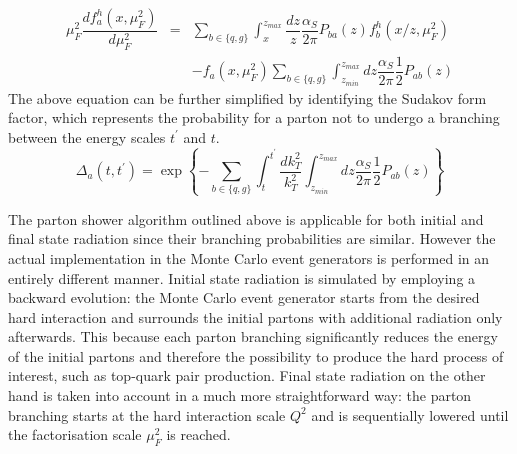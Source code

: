 \begin{eqnarray}
 \mu_{F}^2 \dfrac{d f_{a}^{h}(x,\mu_{F}^{2})}{d \mu_{F}^{2}} & = & \sum_{b \in \{q,g\} } \int_{x}^{z_{max}} \dfrac{dz}{z} \dfrac{\alpha_{S}}{2 \pi} P_{ba}(z) f_{b}^{h}(x/z, \mu_{F}^{2}) \nonumber \\
                                                             &   & - f_{a}(x,\mu_{F}^{2}) \sum_{b \in \{q,g\}} \int_{z_{min}}^{z_{max}} dz \dfrac{\alpha_{S}}{2 \pi} \dfrac{1}{2} P_{ab}(z)
\end{eqnarray}
The above equation can be further simplified by identifying the Sudakov form factor, which represents the probability for a parton not to undergo a branching between the energy scales $t^{'}$ and $t$.
\begin{equation}
 \Delta_{a}(t,t^{'}) = \exp \left\lbrace - \sum_{b \in \{q,g\}} \int_{t}^{t^{'}} \dfrac{dk_{T}^{2}}{k_{T}^{2}} \int_{z_{min}}^{z_{max}} dz \dfrac{\alpha_{S}}{2 \pi} \dfrac{1}{2} P_{ab}(z) \right\rbrace
\end{equation}

The parton shower algorithm outlined above is applicable for both initial and final state radiation since their branching probabilities are similar. However the actual implementation in the Monte Carlo event generators is performed in an entirely different manner. 
Initial state radiation is simulated by employing a backward evolution: the Monte Carlo event generator starts from the desired hard interaction and surrounds the initial partons with additional radiation only afterwards. This because each parton branching significantly reduces the energy of the initial partons and therefore the possibility to produce the hard process of interest, such as top-quark pair production. 
Final state radiation on the other hand is taken into account in a much more straightforward way: the parton branching starts at the hard interaction scale $Q^{2}$ and is sequentially lowered until the factorisation scale $\mu_{F}^{2}$ is reached.

